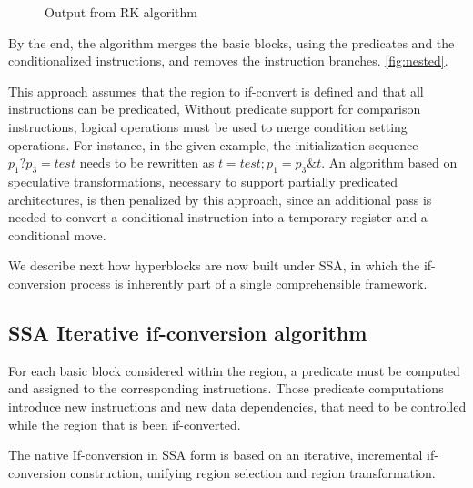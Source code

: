 \begin{figure}
\footnotesize
\caption{Output from RK algorithm}
\label{fig:RK}
\end{figure}

By the end, the algorithm merges the basic blocks, using the predicates and the conditionalized instructions, and removes the instruction branches. \ref{fig:nested}. 

This approach assumes that the region to if-convert is defined and that all instructions can be predicated, Without predicate support for comparison instructions, logical operations must be used to merge condition setting operations. For instance, in the given example, the initialization sequence $p_1 ? p_3=test$ needs to be rewritten as $t=test; p_1=p_3 \& t$. An algorithm based on speculative transformations, necessary to support partially predicated architectures, is then penalized by this approach, since an additional pass is needed to convert a conditional instruction into a temporary register and a conditional move.

We describe next how hyperblocks are now built under SSA, in which the if-conversion process is inherently part of a single comprehensible framework.

\subsection{SSA Iterative if-conversion algorithm}

For each basic block considered within the region, a predicate must be computed and assigned to the corresponding instructions. Those predicate computations introduce new instructions and new data dependencies, that need to be controlled while the region that is been if-converted.

The native If-conversion in SSA form is based on an iterative, incremental if-conversion construction, unifying region selection and region transformation. 

